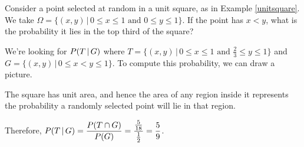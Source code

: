 \begin{examp}
Consider a point selected at random in a unit square, as in Example \ref{unitsquare}. We take $\Omega = \{(x,y) \, | \, 0 \leq x \leq 1 \text{ and } 0 \leq y \leq 1\}$. If the point has $x < y$, what is the probability it lies in the top third of the square?
\par
\noindent We're looking for $P(T \,|\, G)$ where $T = \{(x,y) \, | \, 0 \leq x \leq 1 \text{ and } \frac{2}{3} \leq y \leq 1\}$ and $G = \{(x,y) \, | \, 0 \leq x < y \leq 1\}$. To compute this probability, we can draw a picture.

\begin{center}
\begin{minipage}{1.6in}
\begin{center}
\end{center}
\end{minipage}
\end{center}
\vspace{0pt}

\noindent The square has unit area, and hence the area of any region inside it represents the probability a randomly selected point will lie in that region. 
\par
\noindent Therefore, $P(T \,|\, G) = \displaystyle\frac{P(T \cap G)}{P(G)} = \frac{\frac{5}{18}}{\frac{1}{2}} = \frac{5}{9}$.
\end{examp}


